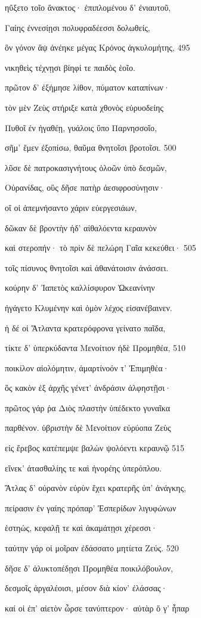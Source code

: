 ηὔξετο τοῖο ἄνακτος· ἐπιπλομένου δ' ἐνιαυτοῦ, 

Γαίης ἐννεσίῃσι πολυφραδέεσσι δολωθείς, 

ὃν γόνον ἂψ ἀνέηκε μέγας Κρόνος ἀγκυλομήτης, 495 

νικηθεὶς τέχνῃσι βίηφί τε παιδὸς ἑοῖο.

πρῶτον δ' ἐξήμησε λίθον, πύματον καταπίνων·

τὸν μὲν Ζεὺς στήριξε κατὰ χθονὸς εὐρυοδείης

Πυθοῖ ἐν ἠγαθέῃ, γυάλοις ὕπο Παρνησσοῖο, 

σῆμ' ἔμεν ἐξοπίσω, θαῦμα θνητοῖσι βροτοῖσι. 500 

λῦσε δὲ πατροκασιγνήτους ὀλοῶν ὑπὸ δεσμῶν, 

Οὐρανίδας, οὓς δῆσε πατὴρ ἀεσιφροσύνῃσιν· 

οἵ οἱ ἀπεμνήσαντο χάριν εὐεργεσιάων,

δῶκαν δὲ βροντὴν ἠδ' αἰθαλόεντα κεραυνὸν

καὶ στεροπήν· τὸ πρὶν δὲ πελώρη Γαῖα κεκεύθει· 505 

τοῖς πίσυνος θνητοῖσι καὶ ἀθανάτοισιν ἀνάσσει.

κούρην δ' Ἰαπετὸς καλλίσφυρον Ὠκεανίνην

ἠγάγετο Κλυμένην καὶ ὁμὸν λέχος εἰσανέβαινεν.

ἡ δέ οἱ Ἄτλαντα κρατερόφρονα γείνατο παῖδα,

τίκτε δ' ὑπερκύδαντα Μενοίτιον ἠδὲ Προμηθέα, 510

ποικίλον αἰολόμητιν, ἁμαρτίνοόν τ' Ἐπιμηθέα· 

ὃς κακὸν ἐξ ἀρχῆς γένετ' ἀνδράσιν ἀλφηστῇσι· 

πρῶτος γάρ ῥα Διὸς πλαστὴν ὑπέδεκτο γυναῖκα

παρθένον. ὑβριστὴν δὲ Μενοίτιον εὐρύοπα Ζεὺς

εἰς ἔρεβος κατέπεμψε βαλὼν ψολόεντι κεραυνῷ 515 

εἵνεκ' ἀτασθαλίης τε καὶ ἠνορέης ὑπερόπλου.

Ἄτλας δ' οὐρανὸν εὐρὺν ἔχει κρατερῆς ὑπ' ἀνάγκης, 

πείρασιν ἐν γαίης πρόπαρ' Ἑσπερίδων λιγυφώνων 

ἑστηώς, κεφαλῇ τε καὶ ἀκαμάτῃσι χέρεσσι· 

ταύτην γάρ οἱ μοῖραν ἐδάσσατο μητίετα Ζεύς. 520

δῆσε δ' ἀλυκτοπέδῃσι Προμηθέα ποικιλόβουλον,

δεσμοῖς ἀργαλέοισι, μέσον διὰ κίον' ἐλάσσας· 

καί οἱ ἐπ' αἰετὸν ὦρσε τανύπτερον· αὐτὰρ ὅ γ' ἧπαρ 


